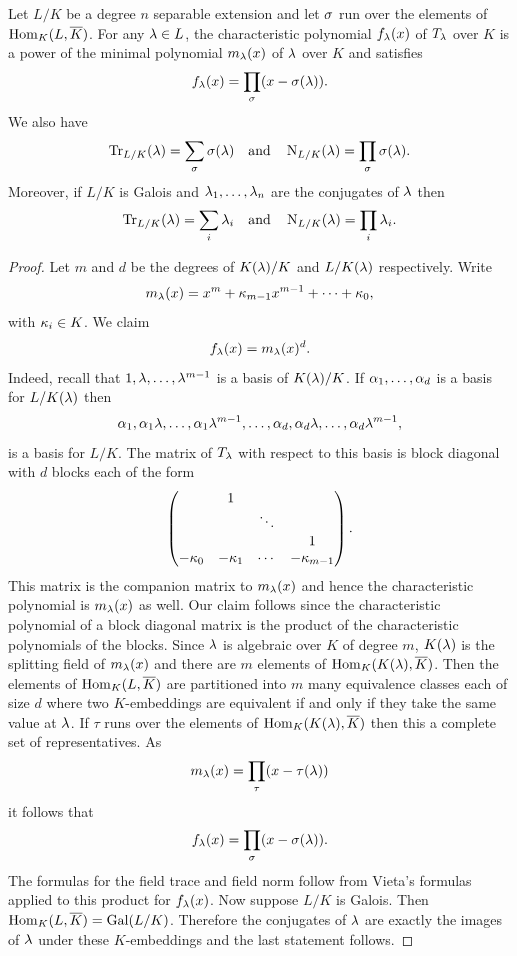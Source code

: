     \begin{proposition}\label{prop:formulas_for_trace_and_norm}
      Let \(L/K\) be a degree \(n\) separable extension and let \(\sigma\) run over the elements of \(\operatorname{\mathrm{Hom}}_{K}(L,\overline{K})\). For any \(\lambda \in L\), the characteristic polynomial \(f_{\lambda}(x)\) of \(T_{\lambda}\) over \(K\) is a power of the minimal polynomial \(m_{\lambda}(x)\) of \(\lambda\) over \(K\) and satisfies
      \[
        f_{\lambda}(x) = \prod_{\sigma}(x-\sigma(\lambda)).
      \]
      We also have
      \[
        \operatorname{\mathrm{Tr}}_{L/K}(\lambda) = \sum_{\sigma}\sigma(\lambda) \quad \text{and} \quad \operatorname{\mathrm{N}}_{L/K}(\lambda) = \prod_{\sigma}\sigma(\lambda).
      \]
      Moreover, if \(L/K\) is Galois and \(\lambda_{1},\ldots,\lambda_{n}\) are the conjugates of \(\lambda\) then
      \[
        \operatorname{\mathrm{Tr}}_{L/K}(\lambda) = \sum_{i}\lambda_{i} \quad \text{and} \quad \operatorname{\mathrm{N}}_{L/K}(\lambda) = \prod_{i}\lambda_{i}.
      \]
    \end{proposition}
    \begin{proof}
      Let $m$ and $d$ be the degrees of \(K(\lambda)/K\) and \(L/K(\lambda)\) respectively. Write
      \[
        m_{\lambda}(x) = x^{m}+\kappa_{m-1}x^{m-1}+\cdots+\kappa_{0},
      \]
      with \(\kappa_{i} \in K\). We claim
      \[
        f_{\lambda}(x) = m_{\lambda}(x)^{d}.
      \]
      Indeed, recall that \(1,\lambda,\ldots,\lambda^{m-1}\) is a basis of \(K(\lambda)/K\). If \(\alpha_{1},\ldots,\alpha_{d}\) is a basis for \(L/K(\lambda)\) then
      \[
        \alpha_{1},\alpha_{1}\lambda,\ldots,\alpha_{1}\lambda^{m-1},\ldots,\alpha_{d},\alpha_{d}\lambda,\ldots,\alpha_{d}\lambda^{m-1},
      \]
      is a basis for \(L/K\). The matrix of \(T_{\lambda}\) with respect to this basis is block diagonal with \(d\) blocks each of the form
      \[
        \begin{pmatrix} & 1 & & \\ & & \ddots & \\ & & & 1 \\ -\kappa_{0} & -\kappa_{1} & \cdots & -\kappa_{m-1} \\ \end{pmatrix}.
      \]
      This matrix is the companion matrix to \(m_{\lambda}(x)\) and hence the characteristic polynomial is \(m_{\lambda}(x)\) as well. Our claim follows since the characteristic polynomial of a block diagonal matrix is the product of the characteristic polynomials of the blocks. Since \(\lambda\) is algebraic over \(K\) of degree \(m\), \(K(\lambda)\) is the splitting field of \(m_{\lambda}(x)\) and there are \(m\) elements of \(\operatorname{\mathrm{Hom}}_{K}(K(\lambda),\overline{K})\). Then the elements of \(\operatorname{\mathrm{Hom}}_{K}(L,\overline{K})\) are partitioned into \(m\) many equivalence classes each of size \(d\) where two \(K\)-embeddings are equivalent if and only if they take the same value at \(\lambda\). If \(\tau\) runs over the elements of \(\operatorname{\mathrm{Hom}}_{K}(K(\lambda),\overline{K})\) then this a complete set of representatives. As
      \[
        m_{\lambda}(x) = \prod_{\tau}(x-\tau(\lambda))
      \]
      it follows that
      \[
        f_{\lambda}(x) = \prod_{\sigma}(x-\sigma(\lambda)).
      \]
      The formulas for the field trace and field norm follow from Vieta's formulas applied to this product for \(f_{\lambda}(x)\). Now suppose \(L/K\) is Galois. Then \(\operatorname{\mathrm{Hom}}_{K}(L,\overline{K}) = \operatorname{\mathrm{Gal}}(L/K)\). Therefore the conjugates of \(\lambda\) are exactly the images of \(\lambda\) under these \(K\)-embeddings and the last statement follows.
    \end{proof}

